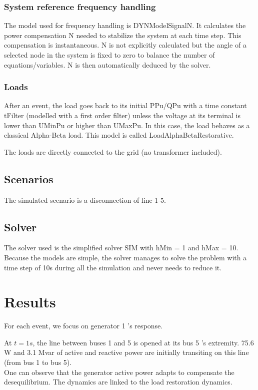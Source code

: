 \documentclass[a4paper, 12pt]{report}
\begin{document}
\subsubsection{System reference frequency handling}

The model used for frequency handling is DYNModelSignalN. It calculates the power compensation N needed to stabilize the system at each time step. This compensation is instantaneous. N is not explicitly calculated but the angle of a selected node in the system is fixed to zero to balance the number of equations/variables. N is then automatically deduced by the solver.

\subsubsection{Loads}

After an event, the load goes back to its initial PPu/QPu with a time constant tFilter (modelled with a first order filter) unless the voltage at its terminal is lower than UMinPu or higher than UMaxPu. In this case, the load behaves as a classical Alpha-Beta load. This model is called LoadAlphaBetaRestorative.

The loads are directly connected to the grid (no transformer included).


\subsection{Scenarios}
The simulated scenario is a disconnection of line 1-5.

\subsection{Solver}
The solver used is the simplified solver SIM with hMin = 1 and hMax = 10. Because the models are simple, the solver manages to solve the problem with a time step of 10s during all the simulation and never needs to reduce it.


\newpage
\section{Results}

For each event, we focus on generator 1 's response.

At $t=1s$, the line between buses 1 and 5 is opened at its bus 5 's extremity. 75.6 W and 3.1 Mvar of active and reactive power are initially transiting on this line (from bus 1 to bus 5).\\
One can observe that the generator active power adapts to compensate the desequilibrium. The dynamics are linked to the load restoration dynamics.
\end{document}
